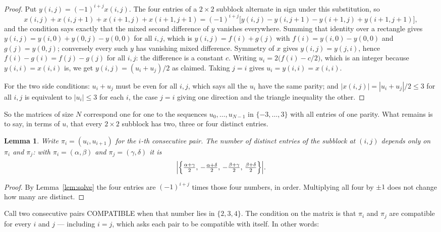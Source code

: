 \documentclass[11pt,a4paper]{article}
\theoremstyle{plain}
\newtheorem{lemma}[theorem]{Lemma}
\theoremstyle{definition}
\begin{document}
\begin{proof}
Put $y(i,j)=(-1)^{i+j}x(i,j)$. The four entries of a $2\times2$ subblock alternate in sign
under this substitution, so
\[
x(i,j)+x(i,j{+}1)+x(i{+}1,j)+x(i{+}1,j{+}1)
=(-1)^{i+j}\bigl[y(i,j)-y(i,j{+}1)-y(i{+}1,j)+y(i{+}1,j{+}1)\bigr],
\]
and the condition says exactly that the mixed second difference of $y$ vanishes everywhere.
Summing that identity over a rectangle gives
$y(i,j)=y(i,0)+y(0,j)-y(0,0)$ for all $i,j$, which is $y(i,j)=f(i)+g(j)$ with
$f(i)=y(i,0)-y(0,0)$ and $g(j)=y(0,j)$; conversely every such $y$ has vanishing mixed
difference. Symmetry of $x$ gives $y(i,j)=y(j,i)$, hence $f(i)-g(i)=f(j)-g(j)$ for all $i,j$:
the difference is a constant $c$. Writing $u_i=2\bigl(f(i)-c/2\bigr)$, which is an integer
because $y(i,i)=x(i,i)$ is, we get $y(i,j)=(u_i+u_j)/2$ as claimed. Taking $j=i$ gives
$u_i=y(i,i)=x(i,i)$.

For the two side conditions: $u_i+u_j$ must be even for all $i,j$, which says all the $u_i$ have
the same parity; and $|x(i,j)|=|u_i+u_j|/2\le3$ for all $i,j$ is equivalent to $|u_i|\le3$
for each $i$, the case $j=i$ giving one direction and the triangle inequality the other.
\end{proof}

So the matrices of size $N$ correspond one for one to the sequences $u_0,\dots,u_{N-1}$ in
$\{-3,\dots,3\}$ with all entries of one parity. What remains is to say, in terms of $u$,
that every $2\times2$ subblock has two, three or four distinct entries.

\begin{lemma}\label{lem:block}
Write $\pi_i=(u_i,u_{i+1})$ for the $i$-th consecutive pair. The number of distinct entries of
the subblock at $(i,j)$ depends only on $\pi_i$ and $\pi_j$: with $\pi_i=(\alpha,\beta)$ and
$\pi_j=(\gamma,\delta)$ it is
\[
\Bigl|\Bigl\{\tfrac{\alpha+\gamma}{2},\,-\tfrac{\alpha+\delta}{2},\,
-\tfrac{\beta+\gamma}{2},\,\tfrac{\beta+\delta}{2}\Bigr\}\Bigr| .
\]
\end{lemma}

\begin{proof}
By Lemma~\ref{lem:solve} the four entries are $(-1)^{i+j}$ times those four numbers, in
order. Multiplying all four by $\pm1$ does not change how many are distinct.
\end{proof}

Call two consecutive pairs COMPATIBLE when that number lies in $\{2,3,4\}$. The condition on the
matrix is that $\pi_i$ and $\pi_j$ are compatible for every $i$ and $j$ --- including $i=j$,
which asks each pair to be compatible with itself. In other words:
\end{document}
